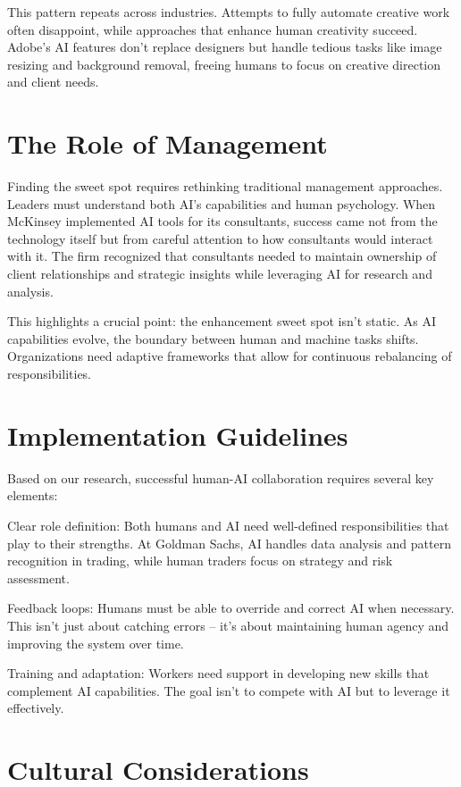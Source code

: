 \documentclass[
  Letterpaper,
]{scrbook}
\begin{document}
This pattern repeats across industries. Attempts to fully automate
creative work often disappoint, while approaches that enhance human
creativity succeed. Adobe's AI features don't replace designers but
handle tedious tasks like image resizing and background removal, freeing
humans to focus on creative direction and client needs.

\section{The Role of Management}\label{the-role-of-management}

Finding the sweet spot requires rethinking traditional management
approaches. Leaders must understand both AI's capabilities and human
psychology. When McKinsey implemented AI tools for its consultants,
success came not from the technology itself but from careful attention
to how consultants would interact with it. The firm recognized that
consultants needed to maintain ownership of client relationships and
strategic insights while leveraging AI for research and analysis.

This highlights a crucial point: the enhancement sweet spot isn't
static. As AI capabilities evolve, the boundary between human and
machine tasks shifts. Organizations need adaptive frameworks that allow
for continuous rebalancing of responsibilities.

\section{Implementation Guidelines}\label{implementation-guidelines}

Based on our research, successful human-AI collaboration requires
several key elements:

Clear role definition: Both humans and AI need well-defined
responsibilities that play to their strengths. At Goldman Sachs, AI
handles data analysis and pattern recognition in trading, while human
traders focus on strategy and risk assessment.

Feedback loops: Humans must be able to override and correct AI when
necessary. This isn't just about catching errors -- it's about
maintaining human agency and improving the system over time.

Training and adaptation: Workers need support in developing new skills
that complement AI capabilities. The goal isn't to compete with AI but
to leverage it effectively.

\section{Cultural Considerations}\label{cultural-considerations}
\end{document}

